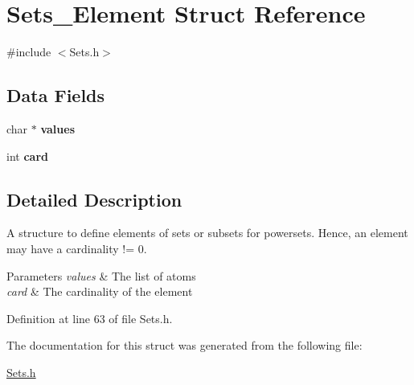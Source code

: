\hypertarget{struct_sets___element}{
\section{Sets\_\-Element Struct Reference}
\label{struct_sets___element}
}


{\ttfamily \#include $<$Sets.h$>$}

\subsection*{Data Fields}
\begin{DoxyCompactItemize}
\item 
\hypertarget{struct_sets___element_ae0a6707762d7508ab3f46a732a4dd8ac}{
char $\ast$ {\bfseries values}}
\label{struct_sets___element_ae0a6707762d7508ab3f46a732a4dd8ac}

\item 
\hypertarget{struct_sets___element_acd789e381a684163a021e2d228653afd}{
int {\bfseries card}}
\label{struct_sets___element_acd789e381a684163a021e2d228653afd}

\end{DoxyCompactItemize}


\subsection{Detailed Description}
A structure to define elements of sets or subsets for powersets. Hence, an element may have a cardinality != 0. 
\begin{DoxyParams}{Parameters}
{\em values} & The list of atoms \\
\hline
{\em card} & The cardinality of the element \\
\hline
\end{DoxyParams}


Definition at line 63 of file Sets.h.



The documentation for this struct was generated from the following file:\begin{DoxyCompactItemize}
\item 
\hyperlink{_sets_8h}{Sets.h}\end{DoxyCompactItemize}
